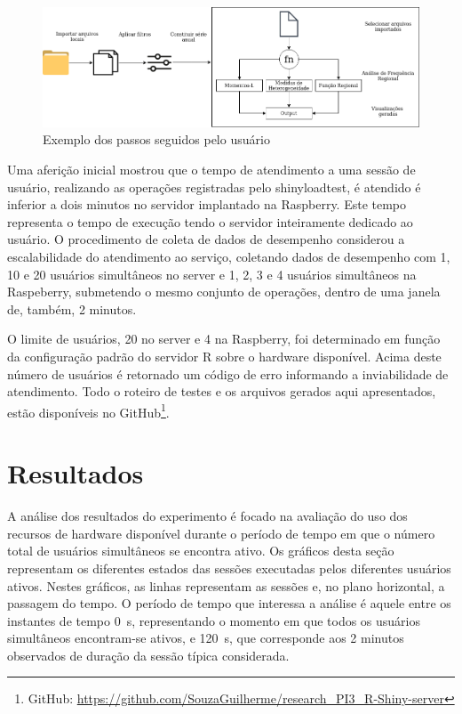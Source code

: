 \documentclass[12pt,english,brazil]{article}
\begin{document}
\begin{figure}[htbp]
  \centering 
  \includegraphics[scale=.4]{paperWSCAD2021/figures/useWebSYHDADrawio-horizontal.png}
  \caption{Exemplo dos passos seguidos pelo usuário}
  \label{usoWebSYHDA}
\end{figure}

Uma aferição inicial mostrou que o tempo de atendimento a uma sessão de usuário, realizando as operações registradas pelo shinyloadtest, é atendido é inferior a dois minutos no servidor implantado na Raspberry. Este tempo representa o tempo de execução tendo o servidor inteiramente dedicado ao usuário. O procedimento de coleta de dados de desempenho considerou a escalabilidade do atendimento ao serviço, coletando dados de desempenho com 1, 10 e 20 usuários simultâneos no server e 1, 2, 3 e 4 usuários simultâneos na Raspeberry, submetendo o mesmo conjunto de operações, dentro de uma janela de, também, 2 minutos.



O limite de usuários, 20 no server e 4 na Raspberry, foi determinado em função da configuração padrão do servidor R sobre o hardware disponível. Acima deste número de usuários é retornado um código de erro informando a inviabilidade de atendimento. Todo o roteiro de testes e os arquivos gerados aqui apresentados, estão disponíveis no GitHub\footnote{GitHub: \url{https://github.com/SouzaGuilherme/research_PI3_R-Shiny-server}}.

\section{Resultados} \label{sec:Resultados}

A análise dos resultados do experimento é focado na avaliação do uso dos recursos de hardware disponível durante o período de tempo em que o número total de usuários simultâneos se encontra ativo. Os gráficos desta seção representam os diferentes estados das sessões executadas pelos diferentes usuários ativos. Nestes gráficos, as linhas representam as sessões e, no plano horizontal, a passagem do tempo. O período de tempo que interessa a análise é aquele entre os instantes de tempo 0~s, representando o momento em que todos os usuários simultâneos encontram-se ativos, e 120~s, que corresponde aos 2 minutos observados de duração da sessão típica considerada. 
\end{document}
